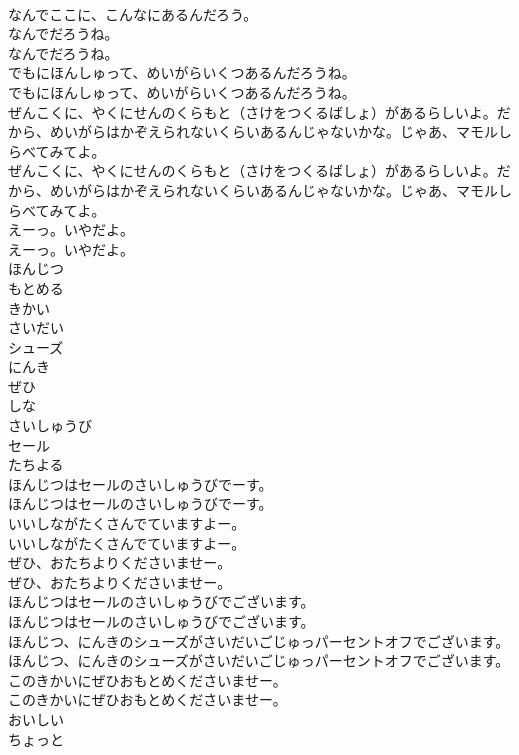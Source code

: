 \documentclass[8pt]{extreport}
\begin{document}
\begin{CJK}{UTF8}{min}
\\	なんでここに、こんなにあるんだろう。 
\\	なんでだろうね。	
\\	なんでだろうね。 
\\	でもにほんしゅって、めいがらいくつあるんだろうね。	
\\	でもにほんしゅって、めいがらいくつあるんだろうね。 
\\	ぜんこくに、やくにせんのくらもと（さけをつくるばしょ）があるらしいよ。だから、めいがらはかぞえられないくらいあるんじゃないかな。じゃあ、マモルしらべてみてよ。	
\\	ぜんこくに、やくにせんのくらもと（さけをつくるばしょ）があるらしいよ。だから、めいがらはかぞえられないくらいあるんじゃないかな。じゃあ、マモルしらべてみてよ。 
\\	えーっ。いやだよ。	
\\	えーっ。いやだよ。 
\\	ほんじつ
\\	もとめる
\\	きかい
\\	さいだい
\\	シューズ
\\	にんき
\\	ぜひ
\\	しな
\\	さいしゅうび
\\	セール
\\	たちよる
\\	ほんじつはセールのさいしゅうびでーす。	
\\	ほんじつはセールのさいしゅうびでーす。 
\\	いいしながたくさんでていますよー。	
\\	いいしながたくさんでていますよー。 
\\	ぜひ、おたちよりくださいませー。	
\\	ぜひ、おたちよりくださいませー。 
\\	ほんじつはセールのさいしゅうびでございます。	
\\	ほんじつはセールのさいしゅうびでございます。 
\\	ほんじつ、にんきのシューズがさいだいごじゅっパーセントオフでございます。	
\\	ほんじつ、にんきのシューズがさいだいごじゅっパーセントオフでございます。 
\\	このきかいにぜひおもとめくださいませー。	
\\	このきかいにぜひおもとめくださいませー。 
\\	おいしい
\\	ちょっと

\end{CJK}
\end{document}
